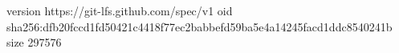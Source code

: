 version https://git-lfs.github.com/spec/v1
oid sha256:dfb20fccd1fd50421c4418f77ec2babbefd59ba5e4a14245facd1ddc8540241b
size 297576
